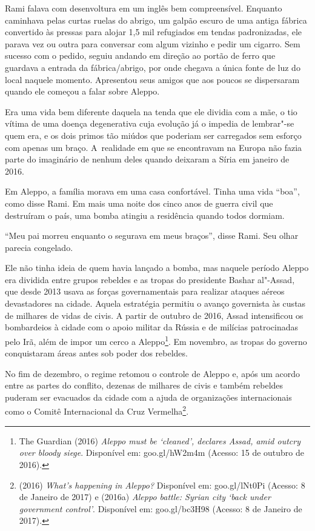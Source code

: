 Rami falava com desenvoltura em um inglês bem compreensível. Enquanto
caminhava pelas curtas ruelas do abrigo, um galpão escuro de uma antiga
fábrica convertido às pressas para alojar 1,5 mil refugiados em tendas
padronizadas, ele parava vez ou outra para conversar com algum vizinho e
pedir um cigarro. Sem sucesso com o pedido, seguiu andando em direção ao
portão de ferro que guardava a entrada da fábrica/abrigo, por onde
chegava a única fonte de luz do local naquele momento. Apresentou seus
amigos que aos poucos se dispersaram quando ele começou a falar sobre
Aleppo.

Era uma vida bem diferente daquela na tenda que ele dividia com a mãe, o
tio vítima de uma doença degenerativa cuja evolução já o impedia de
lembrar"-se quem era, e os dois primos tão miúdos que poderiam ser
carregados sem esforço com apenas um braço. A~realidade em que se
encontravam na Europa não fazia parte do imaginário de nenhum deles
quando deixaram a Síria em janeiro de 2016.

Em Aleppo, a família morava em uma casa confortável. Tinha uma vida
``boa'', como disse Rami. Em mais uma noite dos cinco anos de guerra
civil que destruíram o país, uma bomba atingiu a residência quando todos
dormiam.

``Meu pai morreu enquanto o segurava em meus braços'', disse Rami. Seu
olhar parecia congelado.

Ele não tinha ideia de quem havia lançado a bomba, mas naquele período
Aleppo era dividida entre grupos rebeldes e as tropas do presidente
Bashar al"-Assad, que desde 2013 usava as forças governamentais para
realizar ataques aéreos devastadores na cidade. Aquela estratégia
permitiu o avanço governista às custas de milhares de vidas de civis.
A partir de outubro de 2016, Assad intensificou os bombardeios à
cidade com o apoio militar da Rússia e de milícias patrocinadas pelo
Irã, além de impor um cerco a Aleppo\footnote{ The Guardian (2016) \emph{Aleppo must be `cleaned',
declares Assad, amid outcry over bloody siege}. Disponível em:
goo.gl/hW2m4m
(Acesso: 15 de outubro de 2016).}. Em
novembro, as tropas do governo conquistaram áreas antes sob poder dos
rebeldes.

No fim de dezembro, o regime retomou o controle de Aleppo e, após um
acordo entre as partes do conflito, dezenas de milhares de civis e
também rebeldes puderam ser evacuados da cidade com a ajuda de
organizações internacionais como o Comitê Internacional da Cruz
Vermelha\footnote{  (2016) \emph{What}\emph{'}\emph{s happening in
Aleppo?} Disponível em:
goo.gl/lNt0Pi
(Acesso: 8 de Janeiro
de 2017) e  (2016a) \emph{Aleppo battle: Syrian city}
\emph{`}\emph{back under government control}\emph{'}. Disponível em:
goo.gl/bc3H98
(Acesso: 8 de Janeiro
de 2017).}.

